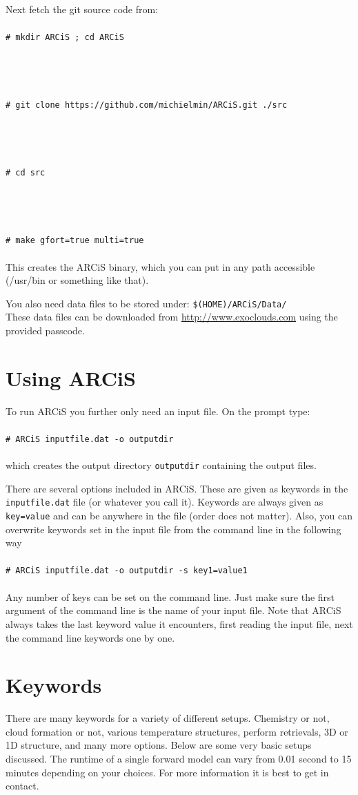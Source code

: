 \documentclass[12pt]{article}
\newcommand{\shellcmd}[1]{\\ \\ \indent\indent\texttt{\# #1}\\ \\ }
\begin{document}
Next fetch the git source code from:
%
\shellcmd{mkdir ARCiS ; cd ARCiS}
\vspace{-2cm}\\
\shellcmd{git clone https://github.com/michielmin/ARCiS.git ./src}
\vspace{-2cm}\\
\shellcmd{cd src}
\vspace{-2cm}\\
\shellcmd{make gfort=true multi=true}
%
This creates the ARCiS binary, which you can put in any path accessible (/usr/bin or something like that).

You also need data files to be stored under: \texttt{\$(HOME)/ARCiS/Data/}\\
These data files can be downloaded from \url{http://www.exoclouds.com} using the provided passcode.

\section{Using ARCiS}

To run ARCiS you further only need an input file. On the prompt type:
%
\shellcmd{ARCiS inputfile.dat -o outputdir}
%
which creates the output directory \texttt{outputdir} containing the output files.

There are several options included in ARCiS. These are given as keywords in the \texttt{inputfile.dat} file (or whatever you call it). Keywords are always given as \texttt{key=value} and can be anywhere in the file (order does not matter). Also, you can overwrite keywords set in the input file from the command line in the following way
%
\shellcmd{ARCiS inputfile.dat -o outputdir -s key1=value1}
%
Any number of keys can be set on the command line. Just make sure the first argument of the command line is the name of your input file. Note that ARCiS always takes the last keyword value it encounters, first reading the input file, next the command line keywords one by one.

\section{Keywords}

There are many keywords for a variety of different setups. Chemistry or not, cloud formation or not, various temperature structures, perform retrievals, 3D or 1D structure, and many more options. Below are some very basic setups discussed. The runtime of a single forward model can vary from 0.01 second to 15 minutes depending on your choices. For more information it is best to get in contact.
\end{document}
